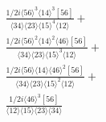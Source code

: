 \documentclass[varwidth, border=5pt]{standalone}
\begin{document}
\begin{my}
$\begin{gathered}
\scriptscriptstyle\frac{1/2i\langle56\rangle^3\langle14\rangle^3[56]}{\langle34\rangle\langle23\rangle\langle15\rangle^4\langle12\rangle}+\\
\scriptscriptstyle\frac{1/2i\langle56\rangle^2\langle14\rangle^2\langle46\rangle[56]}{\langle34\rangle\langle23\rangle\langle15\rangle^3\langle12\rangle}+\\
\scriptscriptstyle\frac{1/2i\langle56\rangle\langle14\rangle\langle46\rangle^2[56]}{\langle34\rangle\langle23\rangle\langle15\rangle^2\langle12\rangle}+\\
\scriptscriptstyle\frac{1/2i\langle46\rangle^3[56]}{\langle12\rangle\langle15\rangle\langle23\rangle\langle34\rangle}\phantom{+}
\end{gathered}$
\end{my}
\end{document}
